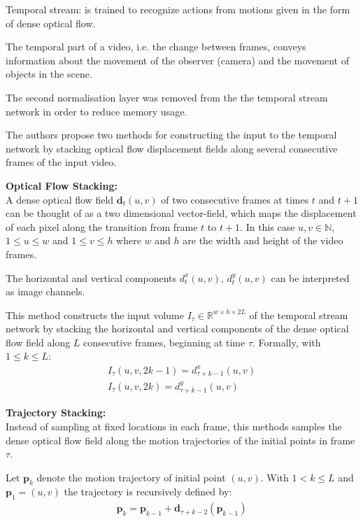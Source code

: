 Temporal stream: is trained to recognize actions from motions given in the form of dense optical flow.

The temporal part of a video, i.e. the change between frames, conveys information about the movement of the observer (camera) and the movement of objects in the scene.

The second normalisation layer was removed from the the temporal stream network in order to reduce memory usage.

The authors propose two methods for constructing the input to the temporal network by stacking optical flow displacement fields along several consecutive frames of the input video.

\textbf{Optical Flow Stacking:} \\
A dense optical flow field $\mathbf{d}_t(u,v)$ of two consecutive frames at times $t$ and $t+1$ can be thought of as a two dimensional vector-field, which maps the displacement of each pixel along the transition from frame $t$ to $t+1$. In this case $u,v \in \mathbb{N}$, $1 \leq u \leq w$ and $1 \leq v \leq h$ where $w$ and $h$ are the width and height of the video frames.

The horizontal and vertical components $d_t^x(u,v)$, $d_t^y(u,v)$ can be interpreted as image channels.

This method constructs the input volume $I_\tau \in \mathbb{R}^{w \times h \times 2L}$ of the temporal stream network by stacking the horizontal and vertical components of the dense optical flow field along $L$ consecutive frames, beginning at time $\tau$. Formally, with $1 \leq k \leq L$:
\begin{align*}
    I_\tau(u,v,2k-1) = d_{\tau + k - 1}^x(u,v) \\
    I_\tau(u,v,2k) = d_{\tau + k - 1}^{y}(u,v)
\end{align*}

\textbf{Trajectory Stacking:} \\
Instead of sampling at fixed locations in each frame, this methods samples the dense optical flow field along the motion trajectories of the initial points in frame $\tau$.

Let $\mathbf{p}_k$ denote the motion trajectory of initial point $(u,v)$. With $1 < k \leq L$ and \mbox{$\mathbf{p}_1 = (u,v)$} the trajectory is recursively defined by:
\begin{align*}
    \mathbf{p}_k = \mathbf{p}_{k-1} + \mathbf{d}_{\tau + k - 2}(\mathbf{p}_{k-1})
\end{align*}

